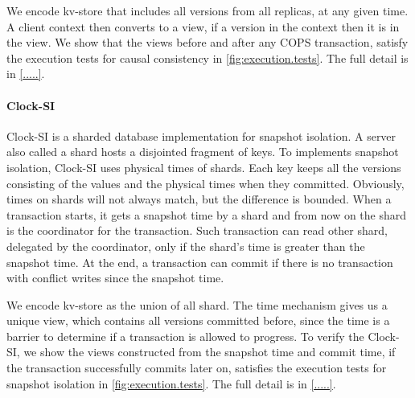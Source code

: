 We encode kv-store that includes all versions from all replicas, at any given time.
A client context then converts to a view, \ie if a version in the context then it is in the view.
We show that the views before and after any COPS transaction,
satisfy the execution tests for causal consistency in \cref{fig:execution.tests}.
The full detail is in \cref{.....}.

\paragraph{\bf Clock-SI}
Clock-SI is a sharded database implementation for snapshot isolation.
A server also called a shard hosts a disjointed fragment of keys.
To implements snapshot isolation, Clock-SI uses physical times of shards.
Each key keeps all the versions consisting of the values and the physical times when they committed.
Obviously, times on shards will not always match, but the difference is bounded.
When a transaction starts, it gets a snapshot time by a shard and from now on the shard is the coordinator for the transaction.
Such transaction can read other shard, delegated by the coordinator, only if the shard's time is greater than the snapshot time.
At the end, a transaction can commit if there is no transaction with conflict writes since the snapshot time.

We encode kv-store as the union of all shard.
The time mechanism gives us a unique view, which contains all versions committed before,
since the time is a barrier to determine if a transaction is allowed to progress.
To verify the Clock-SI, 
we show the views constructed from the snapshot time and commit time,
if the transaction successfully commits later on, 
satisfies the execution tests for snapshot isolation in \cref{fig:execution.tests}.
The full detail is in \cref{.....}.
